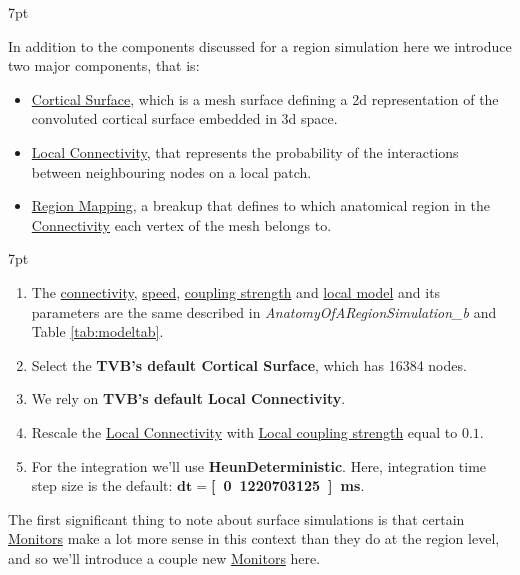 \documentclass{tufte-handout}
\newenvironment{simulation}{%
  \def\FrameCommand{%
    \hspace{1pt}%
    {\color{ForestGreen}\vrule width 2pt}%
    {\color{simulationshade}\vrule width 4pt}%
    \colorbox{simulationshade}%
  }%
  \MakeFramed{\advance\hsize-\width\FrameRestore}%
  \noindent\hspace{-4.55pt}%
  \begin{adjustwidth}{}{7pt}%
  \vspace{2pt}\vspace{2pt}%
}
{%
  \vspace{2pt}\end{adjustwidth}\endMakeFramed%
}
\newenvironment{blah}{%
  \def\FrameCommand{%
    \hspace{1pt}%
    {\color{DarkOrange}\vrule width 2pt}%
    {\color{PeachPuff}\vrule width 4pt}%
    \colorbox{PeachPuff}%
  }%
  \MakeFramed{\advance\hsize-\width\FrameRestore}%
  \noindent\hspace{-4.55pt}%
  \begin{adjustwidth}{}{7pt}%
  \vspace{2pt}\vspace{2pt}%
}
{%
  \vspace{2pt}\end{adjustwidth}\endMakeFramed%
}
\begin{document}
\begin{blah}
In addition to the components discussed for a region simulation here we
introduce two major components, that is:

\begin{itemize}
\item \underline{Cortical Surface}, which is a mesh surface defining
a 2d representation of the convoluted cortical surface embedded in 3d space.
\item \underline{Local Connectivity}, that represents the probability of the interactions between neighbouring nodes on a local patch. 
\item \underline{Region Mapping},  a breakup that defines to which anatomical region in the \underline{Connectivity} each vertex of the mesh belongs to. 
\end{itemize}
\end{blah}

\begin{simulation}
\begin{enumerate}
\item The \underline{connectivity}, \underline{speed}, \underline{coupling strength} and \underline{local model} and its parameters are the same described in  \textit{AnatomyOfARegionSimulation\_b} and Table \ref{tab:modeltab}.
\item Select the \textbf{TVB's default Cortical Surface}, which has 16384 nodes. 
\item We rely on \textbf{TVB's default Local Connectivity}.
\item Rescale the \underline{Local Connectivity} with \underline{Local coupling strength} equal to $\mathbf{0.1}$.
\item For the integration we'll use \textbf{HeunDeterministic}.  Here, integration time step size is the default: $\mathbf{dt=}$\textbf{\unit[0.1220703125]{ms}}.
\end{enumerate}
\end{simulation}

The first significant thing to note about surface simulations is that certain \underline{Monitors} make a lot more sense in this context than they do at the region level, and so we'll introduce a couple new \underline{Monitors} here.

\end{document}
